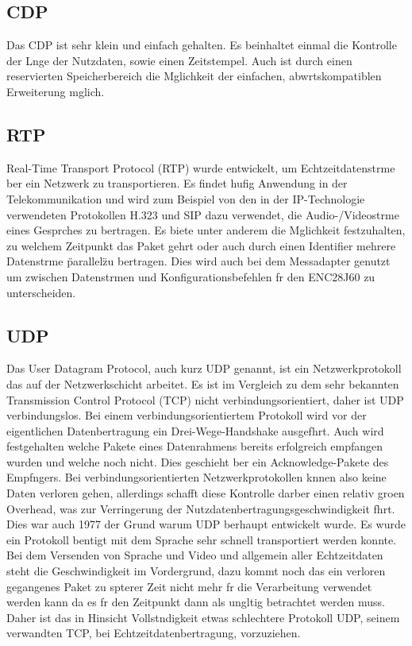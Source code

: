 \documentclass[a4paper]{book}%
\begin{document}
\subsection{CDP}
Das CDP ist sehr klein und einfach gehalten. Es beinhaltet einmal die Kontrolle der Lnge der Nutzdaten, sowie einen Zeitstempel. Auch ist durch einen reservierten Speicherbereich die Mglichkeit der einfachen, abwrtskompatiblen Erweiterung mglich.

\subsection{RTP}
Real-Time Transport Protocol (RTP) wurde entwickelt, um Echtzeitdatenstrme ber ein Netzwerk zu transportieren. Es findet hufig Anwendung in der Telekommunikation und wird zum Beispiel von den in der IP-Technologie verwendeten Protokollen H.323 und SIP dazu verwendet, die Audio-/Videostrme eines Gesprches zu bertragen.
Es biete unter anderem die Mglichkeit festzuhalten, zu welchem Zeitpunkt das Paket gehrt oder auch durch einen Identifier mehrere Datenstrme \"parallel\" zu bertragen. Dies wird auch bei dem Messadapter genutzt um zwischen Datenstrmen und Konfigurationsbefehlen fr den ENC28J60 zu unterscheiden.


\subsection{UDP}

Das User Datagram Protocol, auch kurz UDP genannt, ist ein Netzwerkprotokoll das auf der Netzwerkschicht arbeitet. Es ist im Vergleich zu dem sehr bekannten Transmission Control Protocol (TCP) nicht verbindungsorientiert, daher ist UDP verbindungslos.
Bei einem verbindungsorientiertem Protokoll wird vor der eigentlichen Datenbertragung ein Drei-Wege-Handshake ausgefhrt. Auch wird festgehalten welche Pakete eines Datenrahmens bereits erfolgreich empfangen wurden und welche noch nicht. Dies geschieht ber ein Acknowledge-Pakete des Empfngers. Bei verbindungsorientierten Netzwerkprotokollen knnen also keine Daten verloren gehen, allerdings schafft diese Kontrolle darber einen relativ groen Overhead, was zur Verringerung der Nutzdatenbertragungsgeschwindigkeit fhrt. Dies war auch 1977 der Grund warum UDP berhaupt entwickelt wurde. Es wurde ein Protokoll bentigt mit dem Sprache sehr schnell transportiert werden konnte. Bei dem Versenden von Sprache und Video und allgemein aller Echtzeitdaten steht die Geschwindigkeit im Vordergrund, dazu kommt noch das ein verloren gegangenes Paket zu spterer Zeit nicht mehr fr die Verarbeitung verwendet werden kann da es fr den Zeitpunkt dann als ungltig betrachtet werden muss. Daher ist das in Hinsicht Vollstndigkeit etwas schlechtere Protokoll UDP, seinem verwandten TCP, bei Echtzeitdatenbertragung, vorzuziehen.
\end{document}

